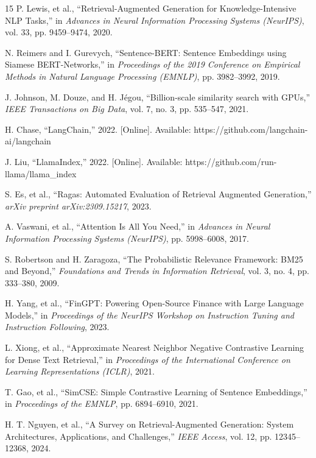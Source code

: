 \documentclass[11pt,journal,onecolumn]{article}
\begin{document}
\begin{thebibliography}{15}
P. Lewis, et al., ``Retrieval-Augmented Generation for Knowledge-Intensive NLP Tasks,'' in \textit{Advances in Neural Information Processing Systems (NeurIPS)}, vol. 33, pp. 9459--9474, 2020.

N. Reimers and I. Gurevych, ``Sentence-BERT: Sentence Embeddings using Siamese BERT-Networks,'' in \textit{Proceedings of the 2019 Conference on Empirical Methods in Natural Language Processing (EMNLP)}, pp. 3982--3992, 2019.

J. Johnson, M. Douze, and H. J\'egou, ``Billion-scale similarity search with GPUs,'' \textit{IEEE Transactions on Big Data}, vol. 7, no. 3, pp. 535--547, 2021.

H. Chase, ``LangChain,'' 2022. [Online]. Available: https://github.com/langchain-ai/langchain

J. Liu, ``LlamaIndex,'' 2022. [Online]. Available: https://github.com/run-llama/llama\_index

S. Es, et al., ``Ragas: Automated Evaluation of Retrieval Augmented Generation,'' \textit{arXiv preprint arXiv:2309.15217}, 2023.

A. Vaswani, et al., ``Attention Is All You Need,'' in \textit{Advances in Neural Information Processing Systems (NeurIPS)}, pp. 5998--6008, 2017.

S. Robertson and H. Zaragoza, ``The Probabilistic Relevance Framework: BM25 and Beyond,'' \textit{Foundations and Trends in Information Retrieval}, vol. 3, no. 4, pp. 333--380, 2009.

H. Yang, et al., ``FinGPT: Powering Open-Source Finance with Large Language Models,'' in \textit{Proceedings of the NeurIPS Workshop on Instruction Tuning and Instruction Following}, 2023.

L. Xiong, et al., ``Approximate Nearest Neighbor Negative Contrastive Learning for Dense Text Retrieval,'' in \textit{Proceedings of the International Conference on Learning Representations (ICLR)}, 2021.

T. Gao, et al., ``SimCSE: Simple Contrastive Learning of Sentence Embeddings,'' in \textit{Proceedings of the EMNLP}, pp. 6894--6910, 2021.

H. T. Nguyen, et al., ``A Survey on Retrieval-Augmented Generation: System Architectures, Applications, and Challenges,'' \textit{IEEE Access}, vol. 12, pp. 12345--12368, 2024.


\end{thebibliography}
\end{document}
